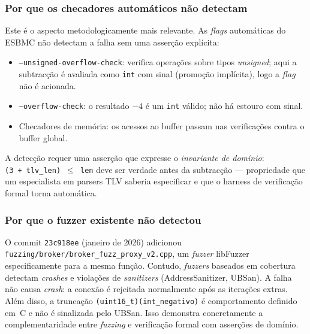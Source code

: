 \documentclass[conference]{IEEEtran}
\begin{document}
\subsubsection*{Por que os checadores autom\'aticos n\~ao detectam}
Este \'e o aspecto metodologicamente mais relevante. As \emph{flags}
autom\'aticas do ESBMC n\~ao detectam a falha sem uma asser\c{c}\~ao expl\'icita:
\begin{itemize}
    \item \texttt{--unsigned-overflow-check}: verifica opera\c{c}\~oes sobre
          tipos \emph{unsigned}; aqui a subtrac\c{c}\~ao \'e avaliada como
          \texttt{int} com sinal (promo\c{c}\~ao impl\'icita), logo a
          \emph{flag} n\~ao \'e acionada.
    \item \texttt{--overflow-check}: o resultado $-4$ \'e um \texttt{int}
          v\'alido; n\~ao h\'a estouro com sinal.
    \item Checadores de mem\'oria: os acessos ao buffer passam nas
          verifica\c{c}\~oes contra o buffer global.
\end{itemize}
A detec\c{c}\~ao requer uma asser\c{c}\~ao que expresse o \emph{invariante de
dom\'inio}: \texttt{(3~+~tlv\_len)~$\leq$~len} deve ser verdade antes da
subtrac\c{c}\~ao --- propriedade que um especialista em parsers TLV saberia
especificar e que o harness de verifica\c{c}\~ao formal torna autom\'atica.

\subsubsection*{Por que o fuzzer existente n\~ao detectou}
O commit \texttt{23c918ee} (janeiro de 2026) adicionou
\texttt{fuzzing/broker/broker\_fuzz\_proxy\_v2.cpp}, um \emph{fuzzer} libFuzzer
especificamente para a mesma fun\c{c}\~ao. Contudo, \emph{fuzzers} baseados em
cobertura detectam \emph{crashes} e viola\c{c}\~oes de \emph{sanitizers}
(AddressSanitizer, UBSan). A falha n\~ao causa \emph{crash}: a conex\~ao \'e
rejeitada normalmente ap\'os as itera\c{c}\~oes extras. Al\'em disso, a
trunca\c{c}\~ao \texttt{(uint16\_t)(int\_negativo)} \'e comportamento definido
em~C e n\~ao \'e sinalizada pelo UBSan. Isso demonstra concretamente a
complementaridade entre \emph{fuzzing} e verifica\c{c}\~ao formal com
asser\c{c}\~oes de dom\'inio.
\end{document}
